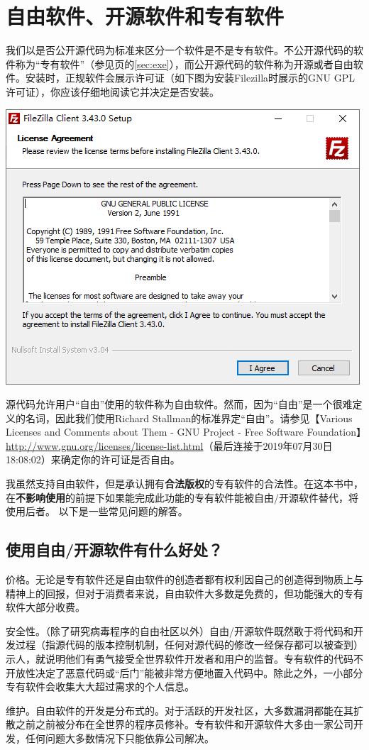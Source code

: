 \chapter{自由软件、开源软件和专有软件}
我们以是否公开源代码为标准来区分一个软件是不是专有软件。不公开源代码的软件称为“专有软件”（参见\pageref{sec:exe}页的\ref{sec:exe}），而公开源代码的软件称为开源或者自由软件。安装时，正规软件会展示许可证（如下图为安装Filezilla时展示的GNU GPL许可证），你应该仔细地阅读它并决定是否安装。
\begin{center}
	\includegraphics[scale=0.5]{pic/fzi}
\end{center}\par
源代码允许用户“自由”使用的软件称为自由软件。然而，因为“自由”是一个很难定义的名词，因此我们使用Richard Stallman的标准界定“自由”。请参见【Various Licenses and Comments about Them - GNU Project - Free Software Foundation】\url{http://www.gnu.org/licenses/license-list.html}（最后连接于2019年07月30日18:08:02）来确定你的许可证是否自由。\par
我虽然支持自由软件，但是承认拥有\textbf{合法版权}的专有软件的合法性。在这本书中，在\textbf{不影响使用}的前提下如果能完成此功能的专有软件能被自由/开源软件替代，将使用后者。
以下是一些常见问题的解答。
\section{使用自由/开源软件有什么好处？}
价格。无论是专有软件还是自由软件的创造者都有权利因自己的创造得到物质上与精神上的回报，但对于消费者来说，自由软件大多数是免费的，但功能强大的专有软件大部分收费。\par
安全性。（除了研究病毒程序的自由社区以外）自由/开源软件既然敢于将代码和开发过程（指源代码的版本控制机制，任何对源代码的修改一经保存都可以被查到）示人，就说明他们有勇气接受全世界软件开发者和用户的监督。专有软件的代码不开放性决定了恶意代码或“后门”能被非常方便地置入代码中。除此之外，一小部分专有软件会收集大大超过需求的个人信息。\par
维护。自由软件的开发是分布式的。对于活跃的开发社区，大多数漏洞都能在其扩散之前之前被分布在全世界的程序员修补。专有软件和开源软件大多由一家公司开发，任何问题大多数情况下只能依靠公司解决。
